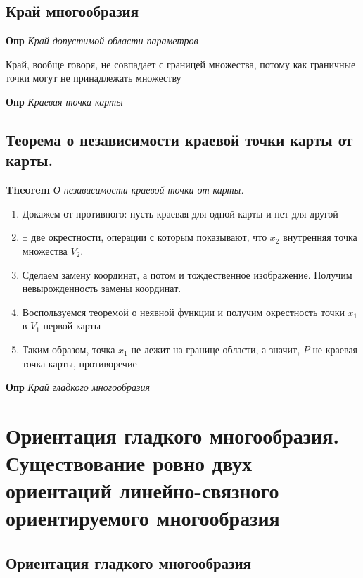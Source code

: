 \documentclass[a4paper, 14pt]{article}
\begin{document}
    \subsection{Край многообразия}
    
    \textbf{Опр} \textit{Край допустимой области параметров}
    
    Край, вообще говоря, не совпадает с границей множества, потому как граничные точки могут не принадлежать множеству
    
    \textbf{Опр} \textit{Краевая точка карты}
    
    \subsection{Теорема о независимости краевой точки карты от карты.}
    
    \textbf{Theorem} \textit{О независимости краевой точки от карты.}
    
    \begin{enumerate}
        \item Докажем от противного: пусть краевая для одной карты и нет для другой
        \item $\exists$ две окрестности, операции с которым показывают, что $x_2$ внутренняя точка множества $V_2$.
        \item Сделаем замену координат, а потом и тождественное изображение.
        Получим невырожденность замены координат.
        \item Воспользуемся теоремой о неявной функции и получим окрестность точки $x_1$ в $V_1$ первой карты
        \item Таким образом, точка $x_1$ не лежит на границе области, а значит, $P$ не краевая точка карты, противоречие
    \end{enumerate}
    
    \textbf{Опр} \textit{Край гладкого многообразия}
    
    \section{Ориентация гладкого многообразия.
    Существование ровно двух ориентаций линейно-связного ориентируемого многообразия}
    
    \subsection{Ориентация гладкого многообразия}
    
\end{document}
